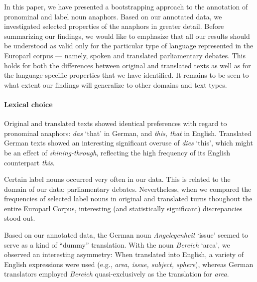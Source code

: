 \documentclass[output=paper]{LSP/langsci}
\begin{document}
In this paper, we have presented a bootstrapping approach to the annotation of pronominal and label noun anaphors. Based on our annotated data, we investigated selected properties of the anaphors in greater detail. Before summarizing our findings, we would like to emphasize that all our results should be understood as valid only for the particular type of language represented in the Europarl corpus --- namely, spoken and translated parliamentary debates. This holds for both the differences between original and translated texts as well as for the language-specific properties that we have identified. It remains to be seen to what extent our findings will generalize to other domains and text types.


\paragraph*{Lexical choice}

Original and translated texts showed identical preferences with regard to pronominal anaphors: \textit{das} `that' in German, and \textit{this, that} in English. Translated German texts showed an interesting significant overuse of \textit{dies} `this', which might be an effect of \emph{shining-through}, reflecting the high frequency of its English counterpart \textit{this}.


Certain label nouns occurred very often in our data. This is related to  the domain of our data: parliamentary debates. Nevertheless, when we compared the frequencies of selected label nouns in original and translated turns thoughout the entire Europarl Corpus, interesting  (and statistically significant) discrepancies stood out.

Based on our annotated data, the German noun \textit{Angelegenheit} `issue' seemed to serve as a kind of ``dummy'' translation. With the noun \textit{Bereich} `area', we observed an interesting asymmetry: When translated into English, a variety of English expressions were used (e.g., \textit{area, issue, subject, sphere}), whereas German translators employed \textit{Bereich} quasi-exclusively as the translation for \textit{area}.
\end{document}
